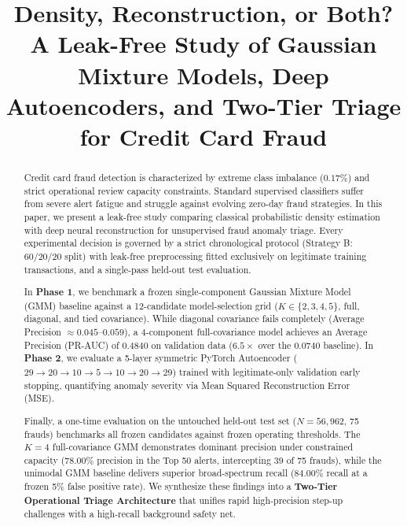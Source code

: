\documentclass[conference]{IEEEtran}
\begin{document}
\title{Density, Reconstruction, or Both?\\A Leak-Free Study of Gaussian Mixture Models, Deep Autoencoders, and Two-Tier Triage for Credit Card Fraud}

\author{
}

\maketitle

\begin{abstract}
Credit card fraud detection is characterized by extreme class imbalance ($0.17\%$) and strict operational review capacity constraints. Standard supervised classifiers suffer from severe alert fatigue and struggle against evolving zero-day fraud strategies. In this paper, we present a leak-free study comparing classical probabilistic density estimation with deep neural reconstruction for unsupervised fraud anomaly triage. Every experimental decision is governed by a strict chronological protocol (Strategy B: 60/20/20 split) with leak-free preprocessing fitted exclusively on legitimate training transactions, and a single-pass held-out test evaluation.

In \textbf{Phase 1}, we benchmark a frozen single-component Gaussian Mixture Model (GMM) baseline against a 12-candidate model-selection grid ($K \in \{2, 3, 4, 5\}$, full, diagonal, and tied covariance). While diagonal covariance fails completely (Average Precision $\approx 0.045$--$0.059$), a 4-component full-covariance model achieves an Average Precision (PR-AUC) of $0.4840$ on validation data ($6.5\times$ over the $0.0740$ baseline). In \textbf{Phase 2}, we evaluate a 5-layer symmetric PyTorch Autoencoder ($29 \to 20 \to 10 \to 5 \to 10 \to 20 \to 29$) trained with legitimate-only validation early stopping, quantifying anomaly severity via Mean Squared Reconstruction Error (MSE). 

Finally, a one-time evaluation on the untouched held-out test set ($N=56,962$, 75 frauds) benchmarks all frozen candidates against frozen operating thresholds. The $K=4$ full-covariance GMM demonstrates dominant precision under constrained capacity ($78.00\%$ precision in the Top 50 alerts, intercepting 39 of 75 frauds), while the unimodal GMM baseline delivers superior broad-spectrum recall ($84.00\%$ recall at a frozen 5\% false positive rate). We synthesize these findings into a \textbf{Two-Tier Operational Triage Architecture} that unifies rapid high-precision step-up challenges with a high-recall background safety net.
\end{abstract}
\end{document}
